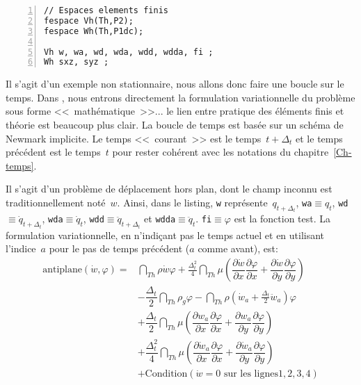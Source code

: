 \color{gris}\scriptsize
\begin{Verbatim}[numbers=left,numbersep=3pt,firstnumber=last]
// Espaces elements finis 
fespace Vh(Th,P2); 
fespace Wh(Th,P1dc);

Vh w, wa, wd, wda, wdd, wdda, fi ; 
Wh sxz, syz ; 
\end{Verbatim}
\color{black}\normalsize

\medskip
Il s'agit d'un exemple non stationnaire, nous allons donc faire une boucle sur le temps. 
Dans \freefem, nous entrons directement la formulation variationnelle du problème sous forme <<~mathématique~>>... 
le lien entre pratique des éléments finis et théorie est beaucoup plus clair. 
La boucle de temps est basée sur un schéma de Newmark implicite. Le temps <<~courant~>>
est le temps~$t+\Delta_t$ et le temps précédent est le temps~$t$ pour rester cohérent avec
les notations du chapitre~\ref{Ch-temps}.

Il s'agit d'un problème de déplacement hors plan, dont le champ inconnu est traditionnellement
noté~$w$. Ainsi, dans le listing, \verb|w| représente~$q_{t+\Delta_t}$, \verb|wa|$\equiv q_t$, 
\verb|wd|$\equiv \dot{q}_{t+\Delta_t}$, \verb|wda|$\equiv \dot{q}_t$, 
\verb|wdd|$\equiv \ddot{q}_{t+\Delta_t}$ et \verb|wdda|$\equiv \ddot{q}_t$. \verb|fi|$\equiv\varphi$
est la fonction test. La formulation variationnelle, en n'indiçant pas le temps actuel et en utilisant l'indice~$a$
pour le pas de temps précédent ($a$ comme avant), est:
\begin{equation}
\begin{array}{rl}
\text{antiplane}(\dot{w},\varphi) = &
	\dint_{Th} \rho \dot{w} \varphi + 
		\frac{\Delta_t^2}4 \dint_{Th} \mu \left( \dfrac{\partial \dot{w}}{\partial x}\dfrac{\partial \varphi}{\partial x} +
		\dfrac{\partial \dot{w}}{\partial y}\dfrac{\partial \varphi}{\partial y}\right)\\[+3ex]
	& - 	\dfrac{\Delta_t}2 \dint_{Th} \rho_g \varphi 
	- \dint_{Th} \rho\left(\dot{w}_a+\frac{\Delta_t}2 \ddot{w}_a\right)\varphi \\[+3ex]
	& + \dfrac{\Delta_t}2 \dint_{Th} \mu \left( \dfrac{\partial w_a}{\partial x}\dfrac{\partial \varphi}{\partial x}
		+ \dfrac{\partial w_a}{\partial y}\dfrac{\partial \varphi}{\partial y} \right) \\[+3ex]
	& + \dfrac{\Delta_t^2}4 \dint_{Th} \mu \left( \dfrac{\partial \dot{w}_a}{\partial x}\dfrac{\partial \varphi}{\partial x} +
		\dfrac{\partial \dot{w}_a}{\partial y}\dfrac{\partial \varphi}{\partial y} \right) \\[+3ex]
	& + \text{Condition} (\dot{w}=0 \text{ sur les lignes} 1,2,3,4)
\end{array}
\end{equation}

